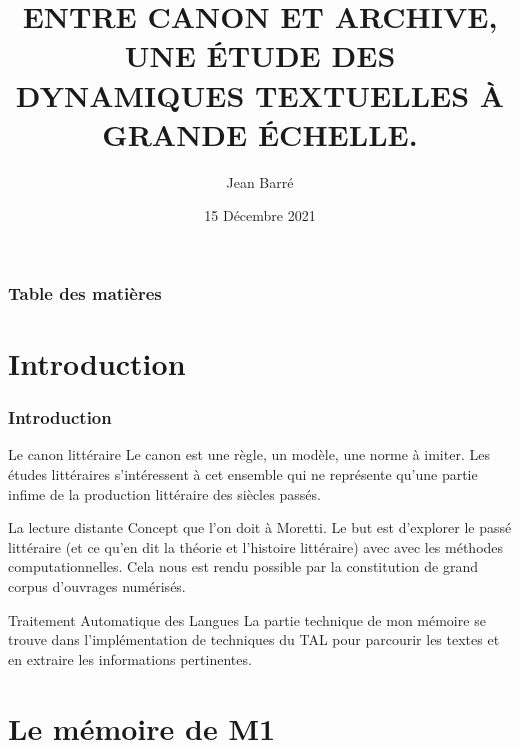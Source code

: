 \documentclass{beamer}
\title[Le prestige littéraire en lecture distante]{ENTRE CANON ET ARCHIVE, UNE ÉTUDE DES DYNAMIQUES TEXTUELLES À GRANDE ÉCHELLE.}
\author{Jean Barré}
\institute[ENC]
{
École Nationale des Chartes
\medskip
\textit{jean.barre@chartes.psl.eu}
}
\date{15 Décembre 2021}
\begin{document}
\begin{frame}
\titlepage
\end{frame}
\begin{frame}
\frametitle{Table des matières}
\tableofcontents
\end{frame}

\section{Introduction}

\begin{frame}
\frametitle{Introduction}

\begin{block}{Le canon littéraire}
Le canon est une règle, un modèle, une norme à imiter. Les études littéraires s’intéressent à cet ensemble qui ne représente qu’une partie infime de la production littéraire des siècles passés.
\end{block}

\begin{block}{La lecture distante\cite{p1}}
Concept que l'on doit à Moretti. Le but est d'explorer le passé littéraire (et ce qu'en dit la théorie et l'histoire littéraire) avec avec les méthodes computationnelles. Cela nous est rendu possible par la constitution de grand corpus d'ouvrages numérisés.
\end{block}

\begin{block}{Traitement Automatique des Langues}
La partie technique de mon mémoire se trouve dans l'implémentation de techniques du TAL pour parcourir les textes et en extraire les informations pertinentes. 
\end{block}

\end{frame}


\section{Le mémoire de M1}
\end{document}

